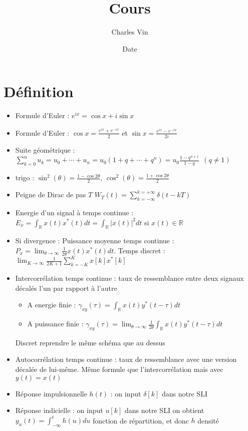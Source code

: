 \documentclass{article}
\title{Cours}
\author{Charles Vin}
\date{Date}
\theoremstyle{plain}%
\theoremstyle{definition}
\theoremstyle{remark}
\begin{document}
\section{Définition}
\begin{itemize}
    \item Formule d'Euler : $ e^{ix} = \cos x + i \sin x $ 
    \item Formule d'Euler : $ \cos x = \frac{e^{ix} + e^{-ix}}{2} $ et $ \sin x = \frac{e^{ix} - e^{-ix}}{2i} $
    \item Suite géométrique : $ \sum _{k=0}^{n}u_{k}=u_{0}+\cdots +u_{n}=u_{0}(1+q+\cdots +q^{n})=u_{0}{\frac {1-q^{n+1}}{1-q}}\ \ (q\neq 1) $
    \item trigo : $ \sin ^2(\theta ) = \frac{1 - \cos 2 \theta }{2}$, $ \cos ^2(\theta ) = \frac{1 + \cos 2 \theta}{2} $ 
    \item Peigne de Dirac de pas $ T $ $ W_T(t) = \sum_{k=-\infty }^{k=+\infty } \delta (t - kT) $
    \item Energie d'un signal à temps continue : $ E_x = \int_{\mathbb{R}}^{} x(t) x^*(t)dt = \int_{\mathbb{R}}^{} \left| x(t) \right| ^2 dt$ si $ x(t) \in \mathbb{R} $ 
    \item Si divergence : Puissance moyenne temps continue : $ P_x = \lim_{\theta  \to \infty} \frac{1}{2 \theta } x(t) x^*(t)dt $. Temps discret : $ \lim_{K \to \infty} \frac{1}{2K+1}\sum_{k=-K}^{K}x[k]x^*[k] $ 
    \item Intercorrélation temps continue : taux de ressemblance entre deux signaux décalés l'un par rapport à l'autre \begin{itemize}
        \item A energie finie : $ \gamma _{xy}(\tau ) = \int_{\mathbb{R}}^{}x(t) y^*(t - \tau ) dt$ 
        \item A puissance finie : $ \gamma _{xy}(\tau ) = \lim_{\theta  \to \infty} \frac{1}{2 \theta } \int_{\mathbb{R}}^{}x(t) y^*(t - \tau ) dt$ 
    \end{itemize} Discret reprendre le même schéma que au dessus
    \item Autocorrélation temps continue : taux de ressemblance avec une version décalée de lui-même. Même formule que l'intercorrélation mais avec $ y(t) = x(t) $ 
    \item Réponse impulsionnelle $ h(t) $ : on input $ \delta [k] $ dans notre SLI
    \item Réponse indicielle : on input $ u [k] $ dans notre SLI on obtient $ y_u(t) = \int_{-\infty }^{t}h(u)du $ fonction de répartition, et donc $ h $ densité

\end{itemize}
\end{document}

